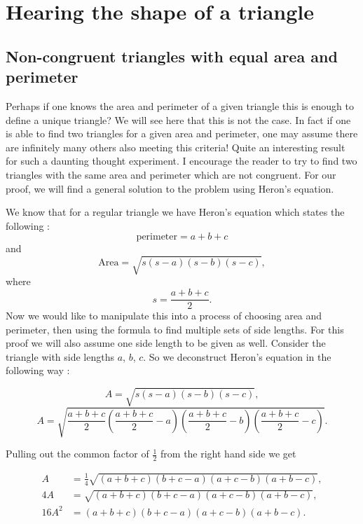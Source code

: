 \documentclass[12pt]{report}
\numberwithin{definition}{section}
\begin{document}
\chapter {Hearing the shape of a triangle}
\break
\section{Non-congruent triangles with equal area and perimeter }


	Perhaps if one knows the area and perimeter of a given triangle this is enough to define a unique triangle? We will see here that this is not the case. In fact if one is able to find two triangles for a given area and perimeter, one may assume there are infinitely many others also meeting this criteria! Quite an interesting result for such a daunting thought experiment. I encourage the reader to try to find two triangles with the same area and perimeter which are not congruent. For our proof, we will find a general solution to the problem using Heron's equation. 
	
	
  

We know that for a regular triangle we have Heron's equation which states the following :
\[ \mbox{perimeter} = a+b+c\]
and
\[ \mbox{Area} = \sqrt{s(s-a)(s-b)(s-c)},  \] 
where 
\[ s = \frac{a+b+c}{2}.  \]
Now we would like to manipulate this into a process of choosing area and perimeter, then using the formula to find multiple sets of side lengths. For this proof we will also assume one side length to be given as well.  Consider the triangle with side lengths $a$, $b$, $c$.  So we deconstruct Heron's equation in the following way  : 

  

\[ A= \sqrt{s(s-a)(s-b)(s-c)},  \] 
\[ A = \sqrt{ \frac{a+b+c}{2}\left( \frac{a+b+c}{2}-a\right)\left( \frac{a+b+c}{2}-b\right)\left( \frac{a+b+c}{2}-c\right)}.  \] 


  


Pulling out the common factor of $\frac{1}{2}$ from the right hand side we get 

  

\begin{align*}
     A&=\frac{1}{4} \sqrt{(a+b+c)(b+c-a)(a+c-b)(a+b-c)},\\   
4A&=\sqrt{(a+b+c)(b+c-a)(a+c-b)(a+b-c)},\\  
16A^2&=(a+b+c)(b+c-a)(a+c-b)(a+b-c).  
\end{align*}
\end{document}

